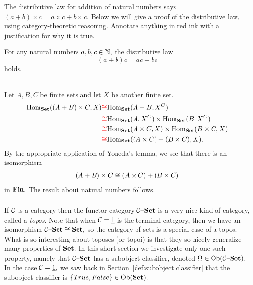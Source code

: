 \documentclass[CT4S-EN-RU]{subfiles}
\begin{document}
\begin{exerciseENG}
The distributive law for addition of natural numbers says $(a+b)\times c=a\times c+b\times c.$ Below we will give a proof of the distributive law, using category-theoretic reasoning. Annotate anything in {\color{red}red} ink  with a justification for why it is true.
\begin{propositionENG}
For any natural numbers $a,b,c\in{\mathbb N},$ the distributive law 
$$(a+b)c=ac+bc$$ 
holds.
\end{propositionENG}
\begin{proofENG}
~\\
Let $A,B,C$ be finite sets and let $X$ be another finite set.
\begin{align*}
\textnormal{Hom}_{\mathbf{Set}}((A+B)\times C,X)
&{\color{red}\cong}\textnormal{Hom}_{\mathbf{Set}}(A+B,X^C)\\
&{\color{red}\cong}\textnormal{Hom}_{\mathbf{Set}}(A,X^C)\times\textnormal{Hom}_{\mathbf{Set}}(B,X^C)\\
&{\color{red}\cong}\textnormal{Hom}_{\mathbf{Set}}(A\times C,X)\times\textnormal{Hom}_{\mathbf{Set}}(B\times C,X)\\
&{\color{red}\cong}\textnormal{Hom}_{\mathbf{Set}}((A\times C)+(B\times C),X).
\end{align*}
By {\color{red} the appropriate application} of Yoneda's lemma, we see that there is an isomorphism
$$(A+B)\times C\cong(A\times C)+(B\times C)$$
in ${\mathbf{Fin}}.$ The result about natural numbers {\color{red}follows}.
\end{proofENG}
\end{exerciseENG}

\begin{exerciseRUS}
\begin{propositionRUS}
\end{propositionRUS}
\begin{proofRUS}
\end{proofRUS}
\end{exerciseRUS}


\subsubsection{}

\begin{blockENG}
If $\mathcal{C}$ is a category then the functor category $\mathcal{C}{\text \textendash}{\mathbf{Set}}$ is a very nice kind of category, called a {\em topos}. Note that when $\mathcal{C}=\underline{1}$ is the terminal category, then we have an isomorphism $\mathcal{C}{\text \textendash}{\mathbf{Set}}\cong{\mathbf{Set}},$ so the category of sets is a special case of a topos. What is so interesting about toposes (or topoi) is that they so nicely generalize many properties of ${\mathbf{Set}}.$ In this short section we investigate only one such property, namely that $\mathcal{C}{\text \textendash}{\mathbf{Set}}$ has a subobject classifier, denoted $\Omega\in\textnormal{Ob}(\mathcal{C}{\text \textendash}{\mathbf{Set}}).$ In the case $\mathcal{C}=\underline{1},$ we saw back in Section~\ref{def:subobject classifier} that the subobject classifier is $\{True,False\}\in\textnormal{Ob}({\mathbf{Set}}).$ 
\end{blockENG}
\end{document}
